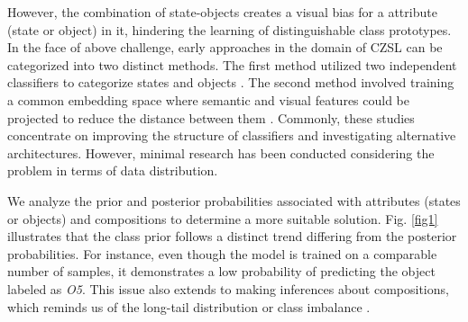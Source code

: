 \documentclass[letterpaper]{article} %
\theoremstyle{definition}
\begin{document}
However, the combination of state-objects creates a visual bias for a attribute (state or object) in it, hindering the learning of distinguishable class prototypes. In the face of above challenge, early approaches in the domain of CZSL can be categorized into two distinct methods. The first method utilized two independent classifiers to categorize states and objects \cite{misra2017red, li2020symmetry, purushwalkam2019task, li2022siamese}. The second method involved training a common embedding space where semantic and visual features could be projected to reduce the distance between them \cite{naeem2021learning, mancini2021open, mancini2022learning}. Commonly, these studies concentrate on improving the structure of classifiers and investigating alternative architectures. However, minimal research has been conducted considering the problem in terms of data distribution.



We analyze the prior and posterior probabilities associated with attributes (states or objects) and compositions to determine a more suitable solution. Fig. \ref{fig1} illustrates that the class prior follows a distinct trend differing from the posterior probabilities. For instance, even though the model is trained on a comparable number of samples, it demonstrates a low probability of predicting the object labeled as \textit{O5}. This issue also extends to making inferences about compositions, which reminds us of the long-tail distribution or class imbalance \cite{menon2020long,tang2020unbiased,kim2020detecting}. 
\end{document}
